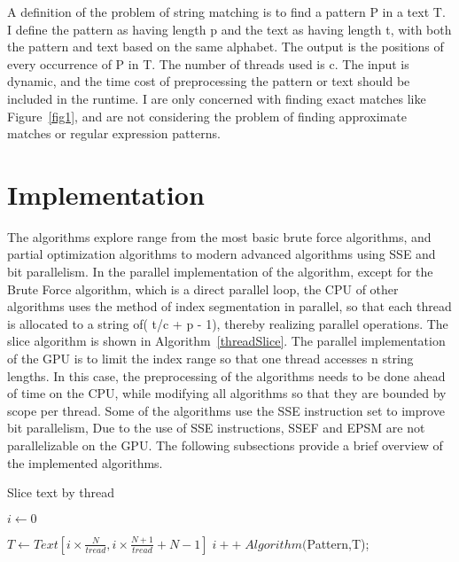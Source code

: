 \documentclass[11pt]{article}       %
\begin{document}
A definition of the problem of string matching is to find a pattern P in a text T.  I define the pattern as having length p and the text as having length t, with both the pattern and text based on the same alphabet. The output is the positions of every occurrence of P in T. The number of threads used is c. The input is dynamic, and the time cost of preprocessing the pattern or text should be included in the runtime. I are only concerned with finding exact matches like Figure~\ref{fig1}, and are not considering the problem of finding approximate matches or regular expression patterns.





\section{Implementation} \label{proposedSolution}

The algorithms explore range from the most basic brute force algorithms, and partial optimization algorithms to modern advanced algorithms using SSE and bit parallelism. In the parallel implementation of the algorithm, except for the Brute Force algorithm, which is a direct parallel loop, the CPU of other algorithms uses the method of index segmentation in parallel, so that each thread is allocated to a string of( t/c + p - 1), thereby realizing parallel operations. The slice algorithm is shown in Algorithm~\ref{threadSlice}. The parallel implementation of the GPU is to limit the index range so that one thread accesses n string lengths. In this case, the preprocessing of the algorithms needs to be done ahead of time on the CPU, while modifying all algorithms so that they are bounded by scope per thread. Some of the algorithms use the SSE instruction set to improve bit parallelism, Due to the use of SSE instructions, SSEF and EPSM are not parallelizable on the GPU. The following subsections provide a brief overview of the implemented algorithms.




\begin{algorithm}[hbt!]
\caption{Slice text by thread}\label{threadSlice}
$i \gets 0$\;
   { 
  $T \gets Text[i \times \frac{N}{tread}, i \times \frac{N+1}{tread} + N - 1]\;
  
  i++\;
  Algorithm($Pattern,T);
  
 }
\end{algorithm}
\end{document}

